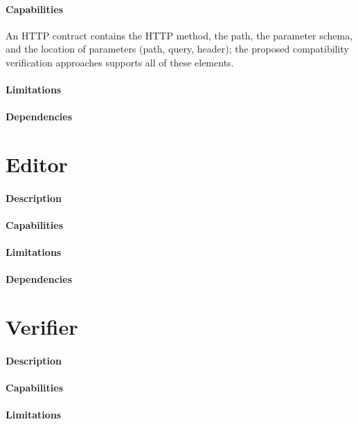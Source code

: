 \paragraph{Capabilities}
An HTTP contract contains the HTTP method, the
path, the parameter schema, and the location of parameters (path, query, header); the
proposed compatibility verification approaches supports all of these elements.
\paragraph{Limitations}
\paragraph{Dependencies}

\section{Editor} %
\label{sec:editor}

\paragraph{Description}
\paragraph{Capabilities}
\paragraph{Limitations}
\paragraph{Dependencies}

\section{Verifier} %
\label{sec:verifier}

\paragraph{Description}
\paragraph{Capabilities}
\paragraph{Limitations}
